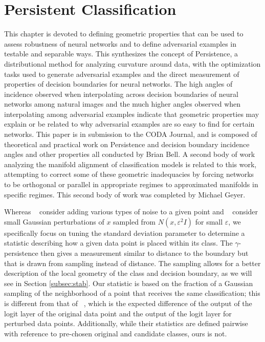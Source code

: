 \chapter{Persistent Classification}
\label{Chapter3}

This chapter is devoted to defining geometric properties
that can be used to assess robustness of neural networks and to
define adversarial examples in testable and separable
ways. This synthesizes the concept of Persistence, a distributional
method for analyzing curvature around data, with the optimization
tasks used to generate adversarial examples and the direct measurement
of properties of decision boundaries for neural networks. The high
angles of incidence observed when interpolating across decision
boundaries of neural networks among natural images and the much higher
angles observed when interpolating among adversarial examples indicate
that geometric properties may explain or be related to why adversarial
examples are so easy to find for certain networks. This paper is in
submission to the CODA Journal, and is composed of theoretical and
practical work on Persistence and decision boundary incidence angles
and other properties all conducted by Brian Bell. A second body of
work analyzing the manifold alignment of classification models is
related to this work, attempting to correct some of these geometric
inadequacies by forcing networks to be orthogonal or parallel in
appropriate regimes to approximated manifolds in specific
regimes. This second body of work was completed by Michael Geyer.

Whereas ~\citet{roth19aodds} consider adding various types of noise to a given point and ~\citet{hosseini2019odds} consider small Gaussian perturbations of $x$ sampled from $N(x,\varepsilon^2 I)$ for small $\varepsilon$, %
we specifically focus on %
tuning the standard deviation parameter to determine a statistic describing how a given data point is placed within its class. The $\gamma$-persistence then gives a measurement similar to distance to the boundary but that is drawn from sampling instead of distance. The sampling allows for a better description of the local geometry of the class and decision boundary, as we will see in Section \ref{subsec:stab}. Our statistic is based on the fraction of a Gaussian sampling of the neighborhood of a point that receives the same classification; this is different from that of ~\citet{roth19aodds}, which is the expected difference of the output of the logit layer of the original data point and the output of the logit layer for perturbed data points.  Additionally, while their statistics are defined pairwise with reference to pre-chosen original and candidate classes, ours is not.

